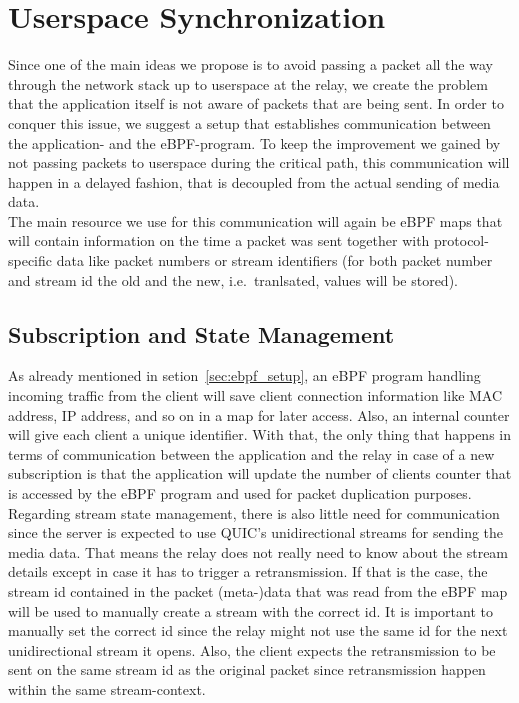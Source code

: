 \section{Userspace Synchronization}\label{sec:userspace_synchronization}

Since one of the main ideas we propose is to avoid passing a packet all the way
through the network stack up to userspace at the relay, we create the problem
that the application itself is not aware of packets that are being sent.
In order to conquer this issue, we suggest a setup that establishes communication
between the application- and the eBPF-program.
To keep the improvement we gained by not passing packets to userspace during the 
critical path, this communication will happen in a delayed fashion, that is 
decoupled from the actual sending of media data.
\\
The main resource we use for this communication will again be eBPF maps that
will contain information on the time a packet was sent together with protocol-specific 
data like packet numbers or stream identifiers (for both packet number 
and stream id the old and the new, i.e.~tranlsated, values will be stored).



\subsection{Subscription and State Management}
As already mentioned in setion~\ref{sec:ebpf_setup}, an eBPF program handling incoming
traffic from the client will save client connection information like MAC address, IP 
address, and so on in a map for later access.
Also, an internal counter will give each client a unique identifier. %
With that, the only thing that happens in terms of communication between the application 
and the relay in case of a new subscription is that the application will update the number 
of clients counter that is accessed by the eBPF program and used for packet duplication purposes.
\\
Regarding stream state management, there is also little need for communication since the 
server is expected to use QUIC's unidirectional streams for sending the media data. 
That means the relay does not really need to know about the stream details except in case it 
has to trigger a retransmission.
If that is the case, the stream id contained in the packet (meta-)data that was read from the eBPF map 
will be used to manually create a stream with the correct id.
It is important to manually set the correct id since the relay might not use the same id for the 
next unidirectional stream it opens.
Also, the client expects the retransmission to be sent on the same stream id as the original packet
since retransmission happen within the same stream-context.


